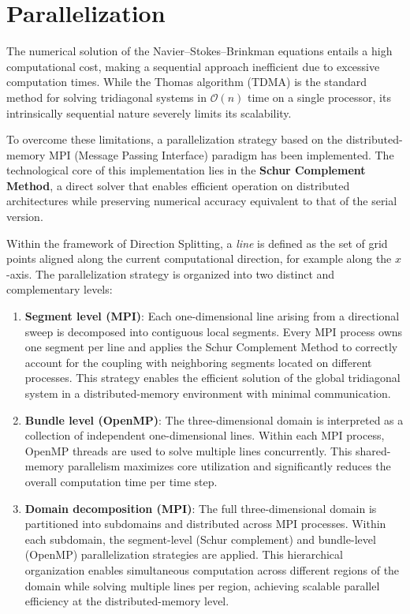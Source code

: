 \documentclass[12pt]{article}
\begin{document}
\section{Parallelization}

The numerical solution of the Navier--Stokes--Brinkman equations entails a high computational cost, making a sequential approach inefficient due to excessive computation times. While the Thomas algorithm (TDMA) is the standard method for solving tridiagonal systems in $\mathcal{O}(n)$ time on a single processor, its intrinsically sequential nature severely limits its scalability.

To overcome these limitations, a parallelization strategy based on the distributed-memory MPI (Message Passing Interface) paradigm has been implemented. The technological core of this implementation lies in the \textbf{Schur Complement Method}, a direct solver that enables efficient operation on distributed architectures while preserving numerical accuracy equivalent to that of the serial version. 

Within the framework of Direction Splitting, a \emph{line} is defined as the set of grid points aligned along the current computational direction, for example along the $x$-axis. The parallelization strategy is organized into two distinct and complementary levels:

\begin{enumerate}
    \item \textbf{Segment level (MPI)}:
    Each one-dimensional line arising from a directional sweep is decomposed into contiguous local segments. Every MPI process owns one segment per line and applies the Schur Complement Method to correctly account for the coupling with neighboring segments located on different processes. This strategy enables the efficient solution of the global tridiagonal system in a distributed-memory environment with minimal communication.

    \item \textbf{Bundle level (OpenMP)}:
    The three-dimensional domain is interpreted as a collection of independent one-dimensional lines. Within each MPI process, OpenMP threads are used to solve multiple lines concurrently. This shared-memory parallelism maximizes core utilization and significantly reduces the overall computation time per time step.

    \item \textbf{Domain decomposition (MPI)}:
    The full three-dimensional domain is partitioned into subdomains and distributed across MPI processes. Within each subdomain, the segment-level (Schur complement) and bundle-level (OpenMP) parallelization strategies are applied. This hierarchical organization enables simultaneous computation across different regions of the domain while solving multiple lines per region, achieving scalable parallel efficiency at the distributed-memory level.
\end{enumerate}
\end{document}
